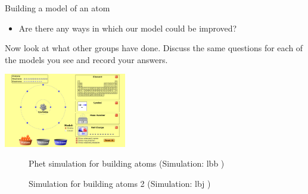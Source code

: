 \begin{groupdiscussion}{Building a model of an atom }
\begin{multicols}{2}
\begin{itemize}[noitemsep]
\label{m38741*uid119}\item Are there any ways in which our model could be improved?
\end{itemize}
        \label{m38741*id260596}Now look at what other groups have done. Discuss the same questions for each of the models you see and record your answers. \par 
\end{multicols}
\begin{center}
 \includegraphics[width=0.4\textwidth]{photos/BuildAtom.png}
\end{center}

\end{groupdiscussion}      
    \setcounter{subfigure}{0}
	\begin{figure}[H] %
    \textnormal{Phet simulation for building atoms} \nopagebreak
  \label{m38806*phet!!!underscore!!!sim}\label{m38806*phet-simulation}
             { (Simulation:  lbb )}
 \end{figure}       
\par 
    \setcounter{subfigure}{0}
	\begin{figure}[H] %
    \textnormal{Simulation for building atoms 2}\nopagebreak
  \label{m38806*phet!!!underscore!!!sim}\label{m38806*phet-simulation}
             { (Simulation:  lbj )}
 \end{figure}       
    \par 
    \label{m38741*cid10}
